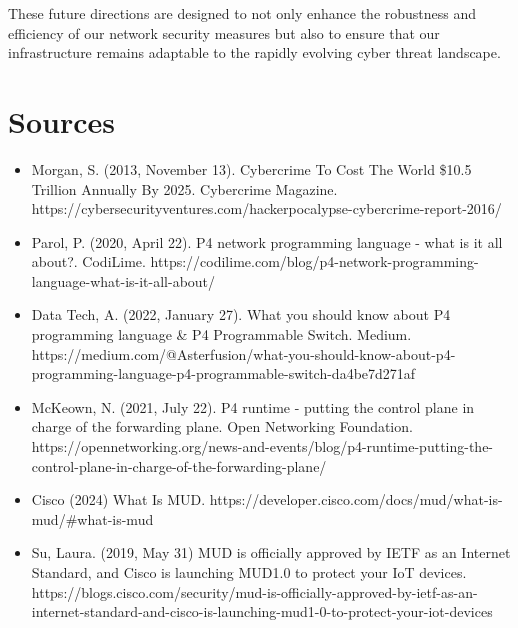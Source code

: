 These future directions are designed to not only enhance the robustness and efficiency of our network security measures but also to ensure that our infrastructure remains adaptable to the rapidly evolving cyber threat landscape. 
\pagebreak

\section{Sources}
\begin{itemize}
    \item Morgan, S. (2013, November 13). Cybercrime To Cost The World \$10.5 Trillion Annually By 2025. Cybercrime Magazine. https://cybersecurityventures.com/hackerpocalypse-cybercrime-report-2016/
    \item Parol, P. (2020, April 22). P4 network programming language - what is it all about?. CodiLime. https://codilime.com/blog/p4-network-programming-language-what-is-it-all-about/
    \item Data Tech, A. (2022, January 27). What you should know about P4 programming language & P4 Programmable Switch. Medium. 
    https://medium.com/@Asterfusion/what-you-should-know-about-p4-programming-language-p4-programmable-switch-da4be7d271af
    \item McKeown, N. (2021, July 22). P4 runtime - putting the control plane in charge of the forwarding plane. Open Networking Foundation. https://opennetworking.org/news-and-events/blog/p4-runtime-putting-the-control-plane-in-charge-of-the-forwarding-plane/
    \item Cisco (2024) What Is MUD. https://developer.cisco.com/docs/mud/what-is-mud/#what-is-mud
    \item Su, Laura. (2019, May 31) MUD is officially approved by IETF as an Internet Standard, and Cisco is launching MUD1.0 to protect your IoT devices. https://blogs.cisco.com/security/mud-is-officially-approved-by-ietf-as-an-internet-standard-and-cisco-is-launching-mud1-0-to-protect-your-iot-devices
\end{itemize}
